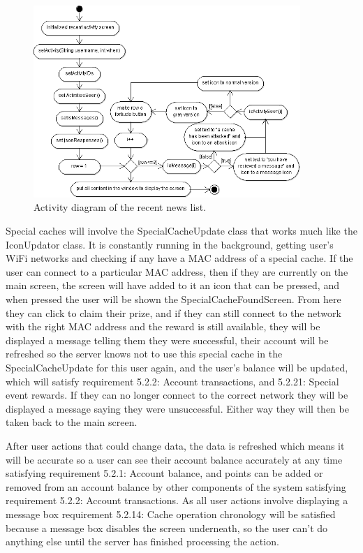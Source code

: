 \begin{figure}
    \centering
    \includegraphics[width=0.9\textwidth]{images/activity/recentActivity}
    \caption{Activity diagram of the recent news list.}
\end{figure}

Special caches will involve the SpecialCacheUpdate class that works much like the IconUpdator class. It is constantly running in the background, getting user's WiFi networks and checking if any have a MAC address of a special cache. If the user can connect to a particular MAC address, then if they are currently on the main screen, the screen will have added to it an icon that can be pressed, and when pressed the user will be shown the SpecialCacheFoundScreen. From here they can click to claim their prize, and if they can still connect to the network with the right MAC address and the reward is still available, they will be displayed a message telling them they were successful, their account will be refreshed so the server knows not to use this special cache in the SpecialCacheUpdate for this user again, and the user's balance will be updated, which will satisfy requirement 5.2.2: Account transactions, and 5.2.21: Special event rewards. If they can no longer connect to the correct network they will be displayed a message saying they were unsuccessful. Either way they will then be taken back to the main screen.

After user actions that could change data, the data is refreshed which means it will be accurate so a user can see their account balance accurately at any time satisfying requirement 5.2.1: Account balance, and points can be added or removed from an account balance by other components of the system satisfying requirement 5.2.2: Account transactions. As all user actions involve displaying a message box requirement 5.2.14: Cache operation chronology will be satisfied because a message box disables the screen underneath, so the user can't do anything else until the server has finished processing the action.

